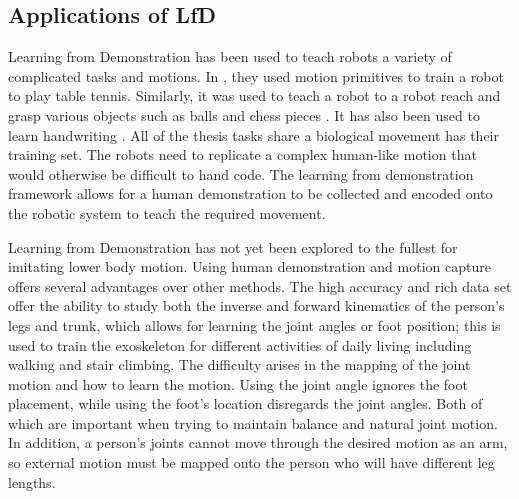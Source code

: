\subsection{Applications of LfD}
\label{sec:applfd}
Learning from Demonstration has been used to teach robots a variety of complicated tasks and motions. In \cite{mulling2013learning}, they used motion primitives to train a robot to play table tennis. Similarly, it was used to teach a robot to a robot reach and grasp various objects such as balls and chess pieces \cite{calinon2007active}  \cite{hersch2008dynamical}. It has also been used to learn handwriting \cite{kulvicius2011joining}. All of the thesis tasks share a biological movement has their training set. The robots need to replicate a complex human-like motion that would otherwise be difficult to hand code. The learning from demonstration framework allows for a human demonstration to be collected and encoded onto the robotic system to teach the required movement.  

Learning from Demonstration has not yet been explored to the fullest for imitating lower body motion. Using human demonstration and motion capture offers several advantages over other methods. The high accuracy and rich data set offer the ability to study both the inverse and forward kinematics of the person's legs and trunk, which allows for learning the joint angles or foot position; this is used to train the exoskeleton for different activities of daily living including walking and stair climbing. The difficulty arises in the mapping of the joint motion and how to learn the motion. Using the joint angle ignores the foot placement, while using the foot's location disregards the joint angles. Both of which are important when trying to maintain balance and natural joint motion. In addition, a person's joints cannot move through the desired motion as an arm, so external motion must be mapped onto the person who will have different leg lengths. 




